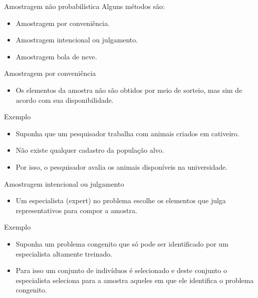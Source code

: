\documentclass[
  ignorenonframetext,
  serif,
  professionalfont,
  usenames,
  dvipsnames,
  aspectratio = 169]{beamer}
\providecommand{\tightlist}{%
  \setlength{\itemsep}{0pt}\setlength{\parskip}{0pt}}
\renewcommand{\tightlist}{%
  \setlength{\itemsep}{0\baselineskip}
  \setlength{\parskip}{0.25\baselineskip}
}
\begin{document}
\begin{frame}{Amostragem não probabilística}
\protect\hypertarget{amostragem-nuxe3o-probabiluxedstica-2}{}
Alguns métodos são:

\begin{itemize}
\tightlist
\item
  Amostragem por conveniência.
\item
  Amostragem intencional ou julgamento.
\item
  Amostragem bola de neve.
\end{itemize}
\end{frame}

\begin{frame}{Amostragem por conveniência}
\protect\hypertarget{amostragem-por-conveniuxeancia}{}
\begin{itemize}
\tightlist
\item
  Os elementos da amostra não são obtidos por meio de sorteio, mas sim
  de acordo com sua disponibilidade.
\end{itemize}

Exemplo

\begin{itemize}
\item
  Suponha que um pesquisador trabalha com animais criados em cativeiro.
\item
  Não existe qualquer cadastro da população alvo.
\item
  Por isso, o pesquisador avalia os animais disponíveis na universidade.
\end{itemize}
\end{frame}

\begin{frame}{Amostragem intencional ou julgamento}
\protect\hypertarget{amostragem-intencional-ou-julgamento}{}
\begin{itemize}
\tightlist
\item
  Um especialista (expert) no problema escolhe os elementos que julga
  representativos para compor a amostra.
\end{itemize}

Exemplo

\begin{itemize}
\item
  Suponha um problema congenito que só pode ser identificado por um
  especialista altamente treinado.
\item
  Para isso um conjunto de indivíduos é selecionado e deste conjunto o
  especialista seleciona para a amostra aqueles em que ele identifica o
  problema congenito.
\end{itemize}
\end{frame}
\end{document}
